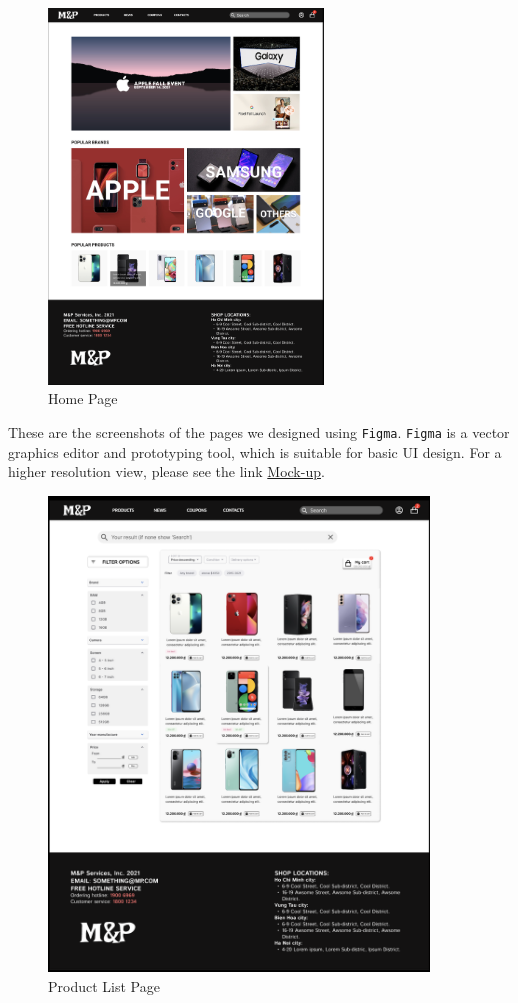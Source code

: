 \documentclass[a4paper]{article}
\numberwithin{equation}{section}
\begin{document}
\begin{figure}[H]
  \centering
  \includegraphics[width=0.65\textwidth]{assets/p2/p1.png}
  \caption{Home Page}
\end{figure}

These are the screenshots of the pages we designed using \texttt{Figma}.
\texttt{Figma} is a vector graphics editor and prototyping tool, which is suitable for basic UI design.
For a higher resolution view, please see the link \href{https://www.figma.com/proto/VaFUVfikhd1N98XmaqhA4p/Mock-up?node-id=35\%3A2504&scaling=scale-down-width&page-id=0\%3A1}{Mock-up}.

\begin{figure}
  \centering
  \includegraphics[width=0.9\textwidth]{assets/p2/p2.png}
  \caption{Product List Page}
\end{figure}
\end{document}
